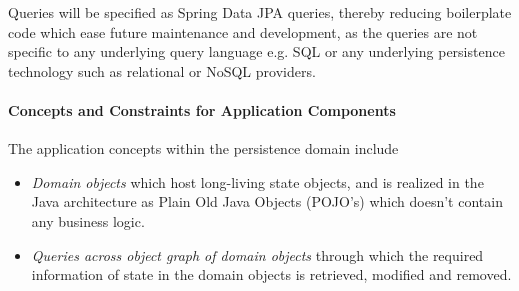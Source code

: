 Queries will be specified as Spring Data JPA queries, thereby reducing
boilerplate code which ease future maintenance and development, as the queries
are not specific to any underlying query language e.g. SQL or any underlying
persistence technology such as relational or NoSQL providers.

\paragraph{Concepts and Constraints for Application Components}
The application concepts within the persistence domain include
\begin{itemize}
	\item \textit{Domain objects} which host long-living state objects, and is realized in the Java architecture as Plain Old Java Objects (POJO's) which doesn't contain any business logic.
	\item \textit{Queries across object graph of domain objects} through which the required information of state in the domain objects is retrieved, modified and removed.
\end{itemize}